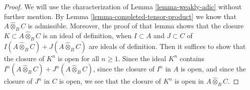 \documentclass{stacks-project}
\theoremstyle{plain}
\theoremstyle{definition}
\theoremstyle{remark}
\numberwithin{equation}{subsection}
\begin{document}
\begin{proof}
We will use the characterization of Lemma \ref{lemma-weakly-adic}
without further mention. By Lemma \ref{lemma-completed-tensor-product}
we know that $A \widehat{\otimes}_B C$ is admissible.
Moreover, the proof of that lemma shows that
the closure $K \subset A \widehat{\otimes}_B C$
is an ideal of definition, when $I \subset A$ and $J \subset C$
of $I(A \widehat{\otimes}_B C) + J(A \widehat{\otimes}_B C)$
are ideals of definition. Then it suffices to show that
the closure of $K^n$ is open for all $n \geq 1$.
Since the ideal $K^n$ contains
$I^n(A \widehat{\otimes}_B C) + J^n(A \widehat{\otimes}_B C)$,
since the closure of $I^n$ in $A$ is open, and
since the closure of $J^n$ in $C$ is open, we
see that the closure of $K^n$ is open in $A \widehat{\otimes}_B C$.
\end{proof}
\end{document}
